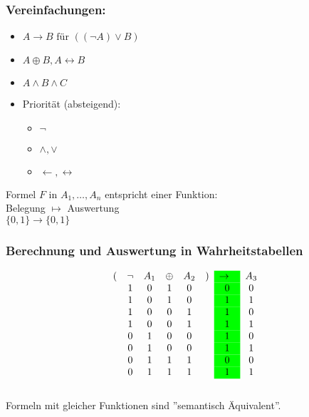 \subsubsection{Vereinfachungen:}
\begin{itemize}
	\item $A \rightarrow B \text{ für } ( ( \neg A ) \vee B )$
	\item $A \oplus B , A \leftrightarrow B$
	\item $A \wedge B \wedge C$
	\item Priorität (absteigend):
	\begin{itemize}
		\item $\neg$
		\item $\wedge , \vee$
		\item $\leftarrow , \leftrightarrow$
	\end{itemize}
\end{itemize}
Formel $F$ in $A_1 , \dotsc , A_n$ entspricht einer Funktion:\\
Belegung $\mapsto$ Auswertung\\
$\{ 0 , 1 \} \rightarrow \{ 0 , 1 \}$

\subsubsection{Berechnung und Auswertung in Wahrheitstabellen}
\begin{gather*}
	\begin{array}{ c c c c c c >{\columncolor{green}}c c }
		(	& \neg	& A_1	& \oplus	& A_2	& )	& \rightarrow	& A_3	\\
			& 1		& 0		& 1		& 0		&	& 0			& 0		\\
			& 1		& 0		& 1		& 0		&	& 1			& 1		\\
			& 1		& 0		& 0		& 1		&	& 1			& 0		\\
			& 1		& 0		& 0		& 1		&	& 1			& 1		\\
			& 0		& 1		& 0		& 0		&	& 1			& 0		\\
			& 0		& 1		& 0		& 0		&	& 1			& 1		\\
			& 0		& 1		& 1		& 1		&	& 0			& 0		\\
			& 0		& 1		& 1		& 1		&	& 1			& 1		
	\end{array}
\end{gather*}\\
Formeln mit gleicher Funktionen sind ''semantisch Äquivalent''.

